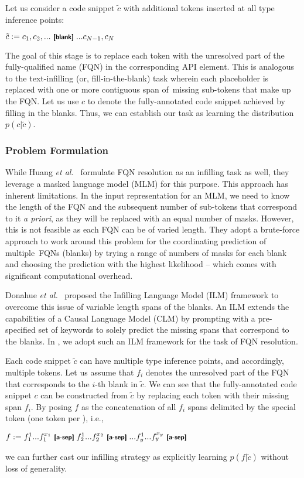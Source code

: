 Let us consider a code snippet $\tilde{c}$ with additional \blank tokens inserted at all type inference points:
\begin{center}
$\tilde{c}:= c_1, c_2, ...\text{ \blank}... c_{N-1}, c_N$
\end{center}
The goal of this stage is to replace each \blank token with the unresolved part of the fully-qualified name (FQN) in the corresponding API element. This is analogous to the text-infilling (or, fill-in-the-blank) task wherein each placeholder \blank is replaced with one or more contiguous span of~missing sub-tokens that make up the FQN. Let us use $c$ to denote the fully-annotated code snippet achieved by filling in the blanks. Thus, we can establish our task as learning the distribution~$p(c|\tilde{c})$.

\subsubsection{Problem Formulation}
\label{sec:ilm-form}
While Huang {\em et al.}~\cite{prompt-ase22} formulate FQN resolution as an infilling task as well, they leverage a masked language model (MLM) for 
this purpose.
This approach has inherent limitations. In the input representation for an MLM, we need to know the length of the FQN and the subsequent number of sub-tokens that correspond to it \textit{a priori}, as they will be replaced with an equal number of masks. However, this is not feasible as each FQN can be of varied length. They adopt a brute-force approach to work around this problem
for the coordinating prediction of multiple~FQNs (blanks)
%
by trying a range of numbers of masks for each blank and choosing the prediction with the highest likelihood -- which comes with significant computational overhead.

Donahue {\em et al.}~\cite{donahue-etal-2020-enabling} proposed the Infilling Language Model (ILM) framework to overcome this issue of variable length spans of the blanks. An ILM extends the capabilities of a Causal Language Model (CLM) by prompting with a pre-specified set of keywords to solely predict the missing spans that correspond to the blanks. In \tool, we adopt such an ILM framework for the task of FQN resolution.

Each code snippet $\tilde{c}$ can have multiple type inference points, and accordingly, multiple \blank tokens. Let us assume that $f_i$ denotes the unresolved part of the FQN that corresponds to the $i$-th blank in $\tilde{c}$. We can see that the fully-annotated code snippet $c$ can be constructed from $\tilde{c}$ by replacing each \blank token with their missing span $f_i$. By posing $f$ as the concatenation of all $f_i$ spans delimited by the special \answer token (one \answer token per \blank), i.e.,
\begin{center}
    $f:= f_1^{1} ... f_1^{x_1} \text{ \answer } f_2^{1} ... f_2^{x_2} \text{ \answer } ... f_y^{1} ... f_y^{x_y} \text{ \answer}$
\end{center}
we can further cast our infilling strategy as explicitly learning $p(f|\tilde{c})$  without loss of generality.

